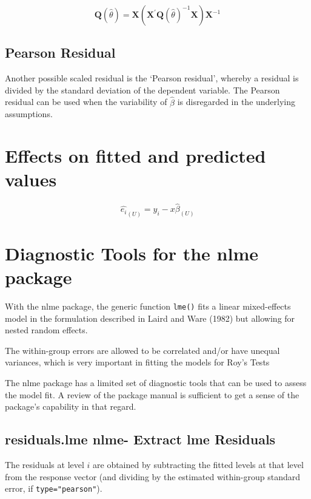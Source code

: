 \documentclass[Main.tex]{subfiles}
\begin{document}
\[ \boldsymbol{Q} (\hat{\theta}) = \boldsymbol{X} ( \boldsymbol{X}^{\prime}\boldsymbol{Q} (\hat{\theta})^{-1}\boldsymbol{X})\boldsymbol{X}^{-1} \]

\subsection{Pearson Residual}%

Another possible scaled residual is the  `Pearson residual', whereby a residual is divided by the standard deviation of the dependent variable. The Pearson residual can be used when the variability of $\hat{\beta}$ is disregarded in the underlying assumptions.



\section{Effects on fitted and predicted values}
\begin{equation}
\hat{e_{i}}_{(U)} = y_{i} - x\hat{\beta}_{(U)}
\end{equation}

\newpage
\section{Diagnostic Tools for the nlme package}


With the nlme package, the generic function \texttt{lme()} fits a linear mixed-effects model in the formulation described in Laird and Ware (1982) but allowing for nested random effects. 

The within-group errors are allowed to be correlated and/or have unequal variances, which is very important in fitting the models for Roy's Tests

The nlme package has a limited set of diagnostic tools that can be used to assess the model fit. A review of the package manual is sufficient to get a sense of the package's capability in that regard.


\subsection{residuals.lme {nlme}- Extract lme Residuals}

The residuals at level $i$ are obtained by subtracting the fitted levels at that level from the response vector (and dividing by the estimated within-group standard error, if \texttt{type="pearson"}). 
\end{document}
